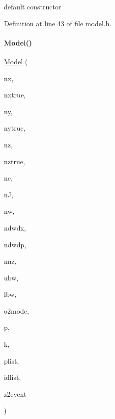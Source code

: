 default constructor 

Definition at line 43 of file model.\+h.

\mbox{\label{classamici_1_1_model_ac267e6f3e952e5c924047c742bf0c5a7}} 
\paragraph{\texorpdfstring{Model()}{Model()}\hspace{0.1cm}{\footnotesize\ttfamily [2/3]}}
{\footnotesize\ttfamily \mbox{\hyperlink{classamici_1_1_model}{Model}} (\begin{DoxyParamCaption}\item[{const int}]{nx,  }\item[{const int}]{nxtrue,  }\item[{const int}]{ny,  }\item[{const int}]{nytrue,  }\item[{const int}]{nz,  }\item[{const int}]{nztrue,  }\item[{const int}]{ne,  }\item[{const int}]{nJ,  }\item[{const int}]{nw,  }\item[{const int}]{ndwdx,  }\item[{const int}]{ndwdp,  }\item[{const int}]{nnz,  }\item[{const int}]{ubw,  }\item[{const int}]{lbw,  }\item[{\mbox{\hyperlink{namespaceamici_a2d77779286167d5603a870bf9f6c21ba}{amici\+::\+Second\+Order\+Mode}}}]{o2mode,  }\item[{const std\+::vector$<$ \mbox{\hyperlink{namespaceamici_a1bdce28051d6a53868f7ccbf5f2c14a3}{amici\+::realtype}} $>$ \&}]{p,  }\item[{std\+::vector$<$ \mbox{\hyperlink{namespaceamici_a1bdce28051d6a53868f7ccbf5f2c14a3}{amici\+::realtype}} $>$}]{k,  }\item[{const std\+::vector$<$ int $>$ \&}]{plist,  }\item[{std\+::vector$<$ \mbox{\hyperlink{namespaceamici_a1bdce28051d6a53868f7ccbf5f2c14a3}{amici\+::realtype}} $>$}]{idlist,  }\item[{std\+::vector$<$ int $>$}]{z2event }\end{DoxyParamCaption})}

